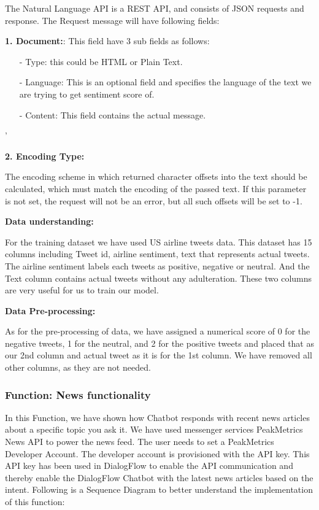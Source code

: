 \documentclass[10pt,conference]{IEEEtran}
\begin{document}
{\raggedright
The Natural Language API is a REST API, and consists of JSON requests and response.
The Request message will have following fields:
}

\textbf{1. Document:}: This field have 3 sub fields as follows:
\begin{itemize}
	\item[-] Type: this could be HTML or Plain Text.
	\item[-] Language: This is an optional field and specifies the language of the text we are trying to get sentiment score of.
	\item[-] Content: This field contains the actual message.
\end{itemize}'

\textbf{2. Encoding Type:}
 {\raggedright
The encoding scheme in which returned character offsets into the text should be calculated, which must match the encoding of the passed text. If this parameter is not set, the request will not be an error, but all such offsets will be set to -1.\\
}

{\raggedright
\textbf{Data understanding:}\\
}

{\raggedright
For the training dataset we have used US airline tweets data. This dataset has 15 columns including Tweet id, airline sentiment, text that represents actual tweets. The airline sentiment labels each tweets as positive, negative or neutral. And the Text column contains actual tweets without any adulteration. These two columns are very useful for us to train our model.
}



{\raggedright
\textbf{Data Pre-processing:}
}

{\raggedright
As for the pre-processing of data, we have assigned a numerical score of 0 for the negative tweets, 1 for the neutral, and 2 for the positive tweets and placed that as our 2nd column and actual tweet as it is for the 1st column. We have removed all other columns, as they are not needed. 
\newline
\newline
}


	\subsubsection {Function:  News functionality  }


{\raggedright
In this Function, we have shown how Chatbot responds with recent news articles about a specific topic you ask it. We have used messenger services PeakMetrics News API to power the news feed. The user needs to set a PeakMetrics Developer Account. The developer account is provisioned with the API key. This API key has been used in DialogFlow to enable the API communication and thereby enable the DialogFlow Chatbot with the latest news articles based on the intent. Following is a Sequence Diagram \cite{thorat2020review} to better understand the implementation of this function:
}
\end{document}
